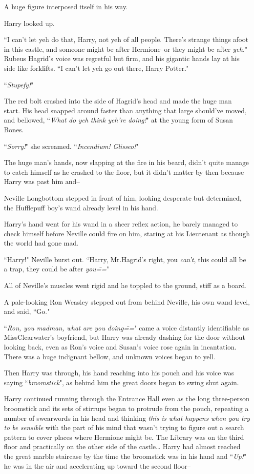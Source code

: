 A huge figure interposed itself in his way.

Harry looked up.

``I can't let yeh do that, Harry, not yeh of all people. There's strange things afoot in this castle, and someone might be after Hermione\---or they might be after \emph{yeh}." Rubeus Hagrid's voice was regretful but firm, and his gigantic hands lay at his side like forklifts. ``I can't let yeh go out there, Harry Potter."

``\emph{Stupefy!}"

The red bolt crashed into the side of Hagrid's head and made the huge man start. His head snapped around faster than anything that large should've moved, and bellowed, ``\emph{What do yeh think yeh're doing!}" at the young form of Susan Bones.

``\emph{Sorry!}" she screamed. ``\emph{Incendium! Glisseo!}"

The huge man's hands, now slapping at the fire in his beard, didn't quite manage to catch himself as he crashed to the floor, but it didn't matter by then because Harry was past him and\---

Neville Longbottom stepped in front of him, looking desperate but determined, the Hufflepuff boy's wand already level in his hand.

Harry's hand went for his wand in a sheer reflex action, he barely managed to check himself before Neville could fire on him, staring at his Lieutenant as though the world had gone mad.

``Harry!" Neville burst out. ``Harry, Mr.\?Hagrid's right, you \emph{can't}, this could all be a trap, they could be after \emph{you\===}"

All of Neville's muscles went rigid and he toppled to the ground, stiff as a board.

A pale-looking Ron Weasley stepped out from behind Neville, his own wand level, and said, ``Go."

``\emph{Ron, you madman, what are you doing\===}" came a voice distantly identifiable as Miss\?Clearwater's boyfriend, but Harry was already dashing for the door without looking back, even as Ron's voice and Susan's voice rose again in incantation. There was a huge indignant bellow, and unknown voices began to yell.

Then Harry was through, his hand reaching into his pouch and his voice was saying ``\emph{broomstick}", as behind him the great doors began to swing shut again.

Harry continued running through the Entrance Hall even as the long three-person broomstick and its sets of stirrups began to protrude from the pouch, repeating a number of swearwords in his head and thinking \emph{this is what happens when you try to be sensible} with the part of his mind that wasn't trying to figure out a search pattern to cover places where Hermione might be. The Library was on the third floor and practically on the other side of the castle{\ldots} Harry had almost reached the great marble staircase by the time the broomstick was in his hand and ``\emph{Up!}" he was in the air and accelerating up toward the second floor\---

